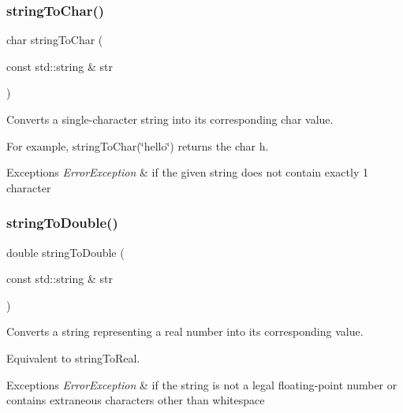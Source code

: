 \subsubsection{\texorpdfstring{string\+To\+Char()}{stringToChar()}}
{\footnotesize\ttfamily char string\+To\+Char (\begin{DoxyParamCaption}\item[{const std\+::string \&}]{str }\end{DoxyParamCaption})}



Converts a single-\/character string into its corresponding char value. 

For example, string\+To\+Char(\char`\"{}hello\char`\"{}) returns the char \textquotesingle{}h\textquotesingle{}. 
\begin{DoxyExceptions}{Exceptions}
{\em Error\+Exception} & if the given string does not contain exactly 1 character \\
\hline
\end{DoxyExceptions}
\mbox{\label{namespacesgl_1_1priv_1_1strlib_ab45e289eae123f82e9155b01ec636710}} 
\subsubsection{\texorpdfstring{string\+To\+Double()}{stringToDouble()}}
{\footnotesize\ttfamily double string\+To\+Double (\begin{DoxyParamCaption}\item[{const std\+::string \&}]{str }\end{DoxyParamCaption})}



Converts a string representing a real number into its corresponding value. 

Equivalent to string\+To\+Real. 
\begin{DoxyExceptions}{Exceptions}
{\em Error\+Exception} & if the string is not a legal floating-\/point number or contains extraneous characters other than whitespace \\
\hline
\end{DoxyExceptions}
\mbox{\label{namespacesgl_1_1priv_1_1strlib_a8c234a839fbe3556e1b7b1d93b92b1e6}} 
